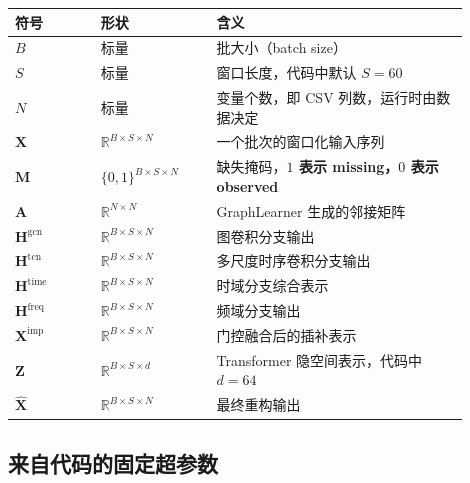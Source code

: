 \documentclass[UTF8]{ctexart}
\begin{document}
\begin{longtable}{>{\raggedright\arraybackslash}p{0.17\linewidth} >{\raggedright\arraybackslash}p{0.23\linewidth} >{\raggedright\arraybackslash}p{0.50\linewidth}}
\toprule
符号 & 形状 & 含义 \\
\midrule
\endhead
$B$ & 标量 & 批大小（batch size） \\
$S$ & 标量 & 窗口长度，代码中默认 $S=60$ \\
$N$ & 标量 & 变量个数，即 CSV 列数，运行时由数据决定 \\
$\bm{X}$ & $\mathbb{R}^{B \times S \times N}$ & 一个批次的窗口化输入序列 \\
$\bm{M}$ & $\{0,1\}^{B \times S \times N}$ & 缺失掩码，\textbf{$1$ 表示 missing，$0$ 表示 observed} \\
$\bm{A}$ & $\mathbb{R}^{N \times N}$ & GraphLearner 生成的邻接矩阵 \\
$\bm{H}^{\text{gcn}}$ & $\mathbb{R}^{B \times S \times N}$ & 图卷积分支输出 \\
$\bm{H}^{\text{tcn}}$ & $\mathbb{R}^{B \times S \times N}$ & 多尺度时序卷积分支输出 \\
$\bm{H}^{\text{time}}$ & $\mathbb{R}^{B \times S \times N}$ & 时域分支综合表示 \\
$\bm{H}^{\text{freq}}$ & $\mathbb{R}^{B \times S \times N}$ & 频域分支输出 \\
$\bm{X}^{\text{imp}}$ & $\mathbb{R}^{B \times S \times N}$ & 门控融合后的插补表示 \\
$\bm{Z}$ & $\mathbb{R}^{B \times S \times d}$ & Transformer 隐空间表示，代码中 $d=64$ \\
$\hat{\bm{X}}$ & $\mathbb{R}^{B \times S \times N}$ & 最终重构输出 \\
\bottomrule
\end{longtable}

\subsection{来自代码的固定超参数}
\end{document}
